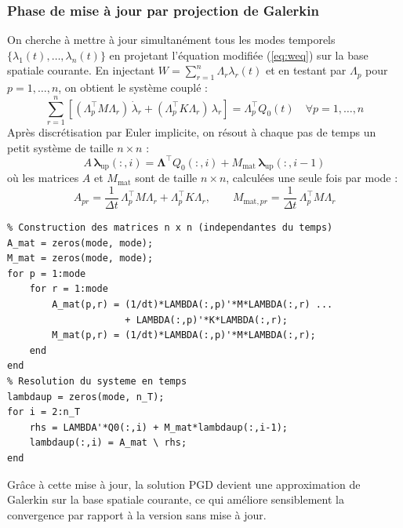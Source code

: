 \documentclass[11pt,a4paper]{article}
\begin{document}
\subsubsection{Phase de mise à jour par projection de Galerkin}

On cherche à mettre à jour simultanément tous les modes temporels
$\{\lambda_1(t), \ldots, \lambda_n(t)\}$ en projetant l'équation modifiée
(\ref{eq:weq}) sur la base spatiale courante.
En injectant $W = \sum_{r=1}^n \Lambda_r \lambda_r(t)$ et en testant par
$\Lambda_p$ pour $p = 1, \ldots, n$, on obtient le système couplé :
\begin{equation}
    \sum_{r=1}^n \left[(\Lambda_p^\top M \Lambda_r)\,\dot{\lambda}_r
    + (\Lambda_p^\top K \Lambda_r)\,\lambda_r\right]
    = \Lambda_p^\top Q_0(t) \quad \forall p = 1, \ldots, n
\end{equation}
Après discrétisation par Euler implicite, on résout à chaque pas de temps
un petit système de taille $n \times n$ :
\begin{equation}
    A\,\boldsymbol{\lambda}_{\text{up}}(:,i)
    = \boldsymbol{\Lambda}^\top Q_0(:,i)
    + M_{\text{mat}}\,\boldsymbol{\lambda}_{\text{up}}(:,i-1)
    \label{eq:update}
\end{equation}
où les matrices $A$ et $M_{\text{mat}}$ sont de taille $n \times n$,
calculées une seule fois par mode :
\begin{equation}
    A_{pr} = \frac{1}{\Delta t}\,\Lambda_p^\top M \Lambda_r
    + \Lambda_p^\top K \Lambda_r,
    \qquad
    M_{\text{mat},pr} = \frac{1}{\Delta t}\,\Lambda_p^\top M \Lambda_r
\end{equation}

\begin{lstlisting}
% Construction des matrices n x n (independantes du temps)
A_mat = zeros(mode, mode);
M_mat = zeros(mode, mode);
for p = 1:mode
    for r = 1:mode
        A_mat(p,r) = (1/dt)*LAMBDA(:,p)'*M*LAMBDA(:,r) ...
                     + LAMBDA(:,p)'*K*LAMBDA(:,r);
        M_mat(p,r) = (1/dt)*LAMBDA(:,p)'*M*LAMBDA(:,r);
    end
end
% Resolution du systeme en temps
lambdaup = zeros(mode, n_T);
for i = 2:n_T
    rhs = LAMBDA'*Q0(:,i) + M_mat*lambdaup(:,i-1);
    lambdaup(:,i) = A_mat \ rhs;
end
\end{lstlisting}

Grâce à cette mise à jour, la solution PGD devient une approximation de Galerkin
sur la base spatiale courante, ce qui améliore sensiblement la convergence par rapport
à la version sans mise à jour.
\end{document}
